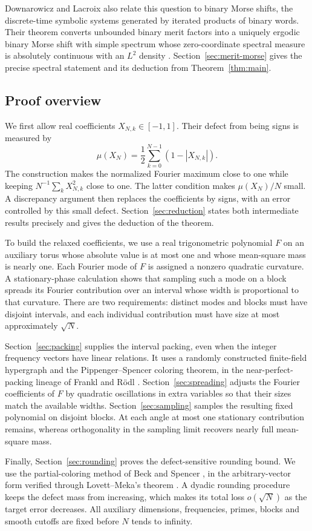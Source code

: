 Downarowicz and Lacroix also relate this question to binary Morse shifts,
the discrete-time symbolic systems generated by iterated products of binary
words. Their theorem converts unbounded binary merit factors into a uniquely
ergodic binary Morse shift with simple spectrum whose zero-coordinate
spectral measure is absolutely continuous with an $L^2$ density
\cite[Theorem~2 and its proof]{DownarowiczLacroix1998}.
Section~\ref{sec:merit-morse} gives the precise spectral statement and its
deduction from Theorem~\ref{thm:main}.

\subsection{Proof overview}
We first allow real coefficients $X_{N,k}\in[-1,1]$. Their defect from
being signs is measured by
\[
 \mu(X_N)=\frac12\sum_{k=0}^{N-1}(1-|X_{N,k}|).
\]
The construction makes the normalized Fourier maximum close to one
while keeping $N^{-1}\sum_k X_{N,k}^2$ close to one. The latter condition
makes $\mu(X_N)/N$ small. A discrepancy argument then replaces the
coefficients by signs, with an error controlled by this small defect.
Section~\ref{sec:reduction} states both intermediate results precisely
and gives the deduction of the theorem.

To build the relaxed coefficients, we use a real trigonometric polynomial
$F$ on an auxiliary torus whose absolute value is at most one and whose
mean-square mass is nearly one. Each Fourier mode of $F$ is assigned a
nonzero quadratic curvature. A stationary-phase calculation shows that
sampling such a mode on a block spreads its Fourier contribution over
an interval whose width is proportional to that curvature. There are two
requirements: distinct modes and blocks must have disjoint intervals,
and each individual contribution must have size at most approximately
$\sqrt N$.

Section~\ref{sec:packing} supplies the interval packing, even when the
integer frequency vectors have linear relations. It uses a randomly
constructed finite-field hypergraph and the Pippenger--Spencer coloring
theorem, in the near-perfect-packing lineage of Frankl and R\"odl
\cite{FranklRodl1985,PippengerSpencer1989,AlonYuster2005}.
Section~\ref{sec:spreading} adjusts the Fourier coefficients of $F$ by
quadratic oscillations in extra variables so that their sizes match the
available widths. Section~\ref{sec:sampling} samples the resulting fixed
polynomial on disjoint blocks. At each angle at most one stationary
contribution remains, whereas orthogonality in the sampling limit
recovers nearly full mean-square mass.

Finally, Section~\ref{sec:rounding} proves the defect-sensitive rounding
bound. We use the partial-coloring method of Beck and Spencer
\cite{Beck1981,Spencer1985}, in the arbitrary-vector form verified through
Lovett--Meka's theorem \cite{LovettMeka2015}. A dyadic rounding procedure
keeps the defect mass from increasing, which makes its total loss
$o(\sqrt N)$ as the target error decreases. All auxiliary dimensions,
frequencies, primes, blocks and smooth cutoffs are fixed before $N$
tends to infinity.
